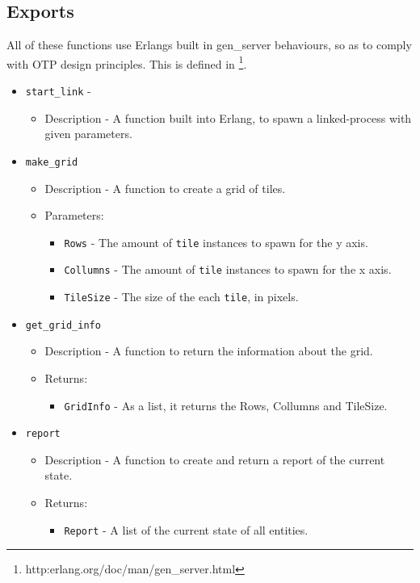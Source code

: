 \subsection{Exports}
All of these functions use Erlangs built in gen\_server behaviours, so as to comply with OTP design principles. This is defined in \footnote{http:erlang.org/doc/man/gen\_server.html}.
\begin{itemize}
	\item {\tt start\_link} - 
		\begin{itemize}
			\item Description - A function built into Erlang, to spawn a linked-process with given parameters.
		\end{itemize}

	\item {\tt make\_grid}
		\begin{itemize}
			\item Description - A function to create a grid of tiles.
			\item Parameters:
				\begin{itemize}
					\item {\tt Rows} - The amount of \verb+tile+ instances to spawn for the y axis.
					\item {\tt Collumns} - The amount of \verb+tile+ instances to spawn for the x axis.
					\item {\tt TileSize} - The size of the each \verb+tile+, in pixels.
				\end{itemize}
		\end{itemize}

	\item {\tt get\_grid\_info}
		\begin{itemize}
			\item Description - A function to return the information about the grid.
			\item Returns:
				\begin{itemize}
					\item {\tt GridInfo} - As a list, it returns the Rows, Collumns and TileSize.
				\end{itemize}
		\end{itemize}

	\item {\tt report}
		\begin{itemize}
			\item Description - A function to create and return a report of the current state.
			\item Returns:
				\begin{itemize}
					\item {\tt Report} - A list of the current state of all entities.
				\end{itemize}
		\end{itemize}


\end{itemize}

